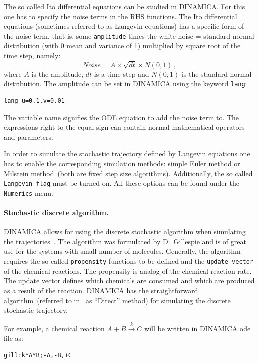 \documentclass[11pt,a4paper]{article}
\begin{document}
The so called Ito differential equations can be studied in DINAMICA. For this one has
to specify the noise terms in the RHS functions. The Ito differential equations
(sometimes referred to as Langevin equations) has a specific form of the noise term,
that is, some \texttt{amplitude} times the white noise = standard normal distribution
(with 0 mean and variance of 1) multiplied by square root of the time step, namely:
$$Noise = A\times\sqrt{dt}\times N(0,1)\,,$$
where $A$ is the amplitude, $dt$ is a time step and $N(0,1)$ is the standard normal
distribution. The amplitude can be set in DINAMICA using the keyword \verb-lang-:
\begin{verbatim}
lang u=0.1,v=0.01
\end{verbatim}

The variable name signifies the ODE equation to add the noise term to. The
expressions right to the equal sign can contain normal mathematical operators and
parameters.

In order to simulate the stochastic trajectory defined by Langevin equations one has
to enable the corresponding simulation methods: simple Euler method or Milstein
method~(both are fixed step size algorithms). Additionally, the so called
\texttt{Langevin flag} must be turned on. All these options can be found under the
\texttt{Numerics} menu.

\paragraph{Stochastic discrete algorithm.}
\label{sec:stoch-discr-algor}

DINAMICA allows for using the discrete stochastic algorithm when simulating the
trajectories~\cite{GillAlg}. The algorithm was formulated by D.~Gillespie and is of
great use for the systems with small number of molecules. Generally, the algorithm
requires the so called \texttt{propensity} functions to be defined and the
\texttt{update vector} of the chemical reactions. The propensity is analog of the
chemical reaction rate. The update vector defines which chemicals are consumed and
which are produced as a result of the reaction. DINAMICA has the straightforward
algorithm~(referred to in~\cite{GillAlg} as ``Direct'' method) for simulating the
discrete stochastic trajectory.

For example, a chemical reaction $A+B \xrightarrow{k} C$ will be written in DINAMICA
ode file as:
\begin{verbatim}
gill:k*A*B;-A,-B,+C
\end{verbatim}
\end{document}
